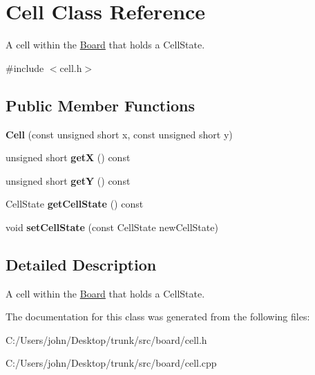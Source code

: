 \hypertarget{class_cell}{}\section{Cell Class Reference}
\label{class_cell}


A cell within the \hyperlink{class_board}{Board} that holds a Cell\+State.  




{\ttfamily \#include $<$cell.\+h$>$}

\subsection*{Public Member Functions}
\begin{DoxyCompactItemize}
\item 
{\bfseries Cell} (const unsigned short x, const unsigned short y)\hypertarget{class_cell_a2ac431ba0bf2dada4d00333c8891b46a}{}\label{class_cell_a2ac431ba0bf2dada4d00333c8891b46a}

\item 
unsigned short {\bfseries getX} () const \hypertarget{class_cell_a112dfbd0a8c491140fbce35033c6d8c1}{}\label{class_cell_a112dfbd0a8c491140fbce35033c6d8c1}

\item 
unsigned short {\bfseries getY} () const \hypertarget{class_cell_a41517ea1d0fe2ab788f16e1d9c42d2bf}{}\label{class_cell_a41517ea1d0fe2ab788f16e1d9c42d2bf}

\item 
Cell\+State {\bfseries get\+Cell\+State} () const \hypertarget{class_cell_a915474879b5063a8b635078fa0ae6e98}{}\label{class_cell_a915474879b5063a8b635078fa0ae6e98}

\item 
void {\bfseries set\+Cell\+State} (const Cell\+State new\+Cell\+State)\hypertarget{class_cell_a0c15d367b3df1ef26b08340693c741d1}{}\label{class_cell_a0c15d367b3df1ef26b08340693c741d1}

\end{DoxyCompactItemize}


\subsection{Detailed Description}
A cell within the \hyperlink{class_board}{Board} that holds a Cell\+State. 

The documentation for this class was generated from the following files\+:\begin{DoxyCompactItemize}
\item 
C\+:/\+Users/john/\+Desktop/trunk/src/board/cell.\+h\item 
C\+:/\+Users/john/\+Desktop/trunk/src/board/cell.\+cpp\end{DoxyCompactItemize}
